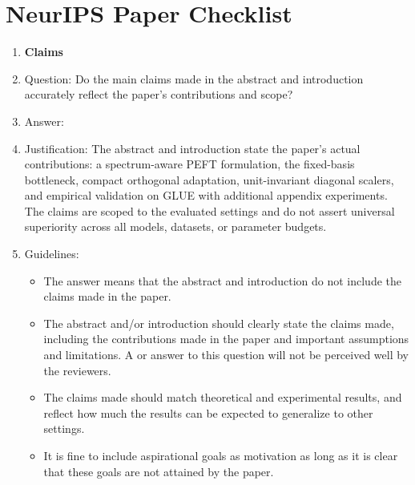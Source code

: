 \section*{NeurIPS Paper Checklist}

\begin{enumerate}

\item {\bf Claims}
    \item[] Question: Do the main claims made in the abstract and introduction accurately reflect the paper's contributions and scope?
    \item[] Answer: \answerYes{}
    \item[] Justification: The abstract and introduction state the paper's actual contributions: a spectrum-aware PEFT formulation, the fixed-basis bottleneck, compact orthogonal adaptation, unit-invariant diagonal scalers, and empirical validation on GLUE with additional appendix experiments. The claims are scoped to the evaluated settings and do not assert universal superiority across all models, datasets, or parameter budgets.
    \item[] Guidelines:
    \begin{itemize}
        \item The answer \answerNA{} means that the abstract and introduction do not include the claims made in the paper.
        \item The abstract and/or introduction should clearly state the claims made, including the contributions made in the paper and important assumptions and limitations. A \answerNo{} or \answerNA{} answer to this question will not be perceived well by the reviewers. 
        \item The claims made should match theoretical and experimental results, and reflect how much the results can be expected to generalize to other settings. 
        \item It is fine to include aspirational goals as motivation as long as it is clear that these goals are not attained by the paper. 
    \end{itemize}


\end{enumerate}
